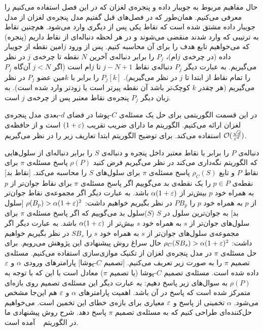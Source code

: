 حال مفاهیم مربوط به جویبار داده و پنجره‌ی لغزان که در این فصل استفاده می‌کنیم را معرفی می‌کنیم. همان‌طور که در فصل‌های قبل گفتیم مدل پنجره‌ی لغزان از مدل جویبار داده مشتق شده است که نقاط یکی پس از دیگری وارد می‌شود. هم‌چنین نقاط به ترتیبی که وارد شدند منقضی می‌شوند و در هر لحظه دنباله‌ای از نقاط داریم (پنجره) که می‌خواهیم تابع هدف را برای آن محاسبه کنیم. پس از ورود $j$امین نقطه از جویبار داده (در چرخه‌ی $j$ام)، $P_j$ را برابر دنباله‌ی آخرین $N$ نقطه تا چرخه‌ی $j$ در نظر می‌گیریم. به عبارت دیگر $P_j$ دنباله‌ی نقاط 
$j-N+1$
 تا $j$ام است (اگر $ j < N$ آن‌گاه $P_j$ را تمام نقاط از ابتدا تا $j$ در نظر می‌گیریم). $P_j[k]$ را برابر با $k$مین عضو $P_j$ در نظر می‌گیریم (هر چقدر $k$ کوچک‌تر باشد آن نقطه پیرتر است یا زودتر وارد شده است). به زبان دیگر $P_j$ پنجره‌ی نقاط معتبر پس از چرخه‌ی $j$ است.

 در این قسمت الگوریتمی برای حل یک مسئله‌ی $C$-پوشا در فضای $d$-بعدی مدل پنجره‌ی لغزان ارائه می‌کنیم. الگوریتم ما دارای ضریب تقریب $(1+\varepsilon)$ است و از حافظه‌ی $\mathcal{O}(\frac{\sqrt{d}}{\varepsilon^d})$ استفاده می‌کند. برای توضیح الگوریتم ابتدا تعاریف زیر را در نظر می‌گیریم.
 
دنباله‌ی $P$ را برابر با نقاط معتبر داخل پنجره و دنباله‌ی $S$ را برابر دنباله‌‌ای از سلول‌هایی که الگوریتم نگه‌داری می‌کند در نظر می‌گیریم  فرض کنید $\rho(P)$ پاسخ مسئله‌ی $\pi$ برای نقاط $P$ و تابع $\rho_C(S)$ پاسخ مسئله‌ی $\pi$ برای سلول‌های $S$ را محاسبه می‌کند. 
[نقاط بد] نقطه‌ی $p \in P$ را یک نقطه‌ی بد می‌گوییم اگر پاسخ مسئله‌ی $\pi$ برای نقاط جوان‌تر از $p$ به همراه خود $p$ بیش‌تر از $\alpha (1+\varepsilon)$ باشد. به عبارت دیگر اگر مجموعه‌ی نقاط جوان‌تر از $p$ به همراه خود $p$ را $PB_p$ در نظر بگیریم خواهیم داشت:
$ \rho(B_p) > \alpha (1+\varepsilon)^2$
[سلول بد] به جوان‌ترین سلول در $S$  ($S$)سلول بد می‌گوییم که اگر پاسخ مسئله‌ی $\pi$ برای سلول‌های جوان‌تر از $s$ به همراه خود $s$ بیش‌تر از $\alpha (1+\varepsilon)$ باشد. به عبارت دیگر اگر مجموعه‌ی سلول‌های جوان‌تر از $s$ به همراه خود $s$ را $SB_s$ در نظر بگیریم خواهیم داشت:
$ \rho_C(SB_s) > \alpha (1+\varepsilon)^2$
حال سراغ روش پیشنهادی این پژوهش می‌رویم. برای حل مسئله‌ی $\pi$ در مدل پنجره‌ی لغزان از تکنیک موازی‌سازی استفاده می‌کنیم. مسئله‌ی تصمیم $\pi$ را به صورت زیر تعریف می‌کنیم.
[تصمیم $C$-پوشا]
پارامترهای ورودی $\alpha$ و $\varepsilon$ داده شده است. مسئله‌ی تصمیم $C$-پوشا (یا تصمیم $\pi$) معادل است با  این که با توجه به $\rho(P)$ به سوال‌های زیر پاسخ دهیم:
به عبارت دیگر این مسئله‌ی تصمیم روی بازه‌ای متمرکز شده است که پاسخ در آن باشد. اهمیت پارامتر‌های $\alpha$ و $\varepsilon$ هم این‌جا مشخص می‌شود. $\alpha$ تخمینی از پاسخ  و $\varepsilon$ معیاری برای بازه‌‌ی خطای این تخمین است. می‌خواهیم حل‌کننده‌ای طراحی کنیم که به مسئله‌ی تصمیم $\pi$ پاسخ دهد.  شرح روش پیشنهادی ما در الگوریتم ~ آمده است.

